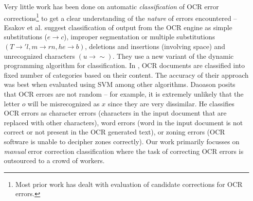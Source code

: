 \documentclass[10pt, conference, compsocconf]{IEEEtran}
\begin{document}
Very little work has been done on automatic \emph{classification} of OCR error corrections\footnote{Most prior work has dealt with evaluation of candidate corrections for OCR errors.} to get a clear understanding of the \emph{nature} of errors encountered -- Esakov et al. \cite{Esakov_94a} suggest classification of output from the OCR engine as simple substitutions ($e \rightarrow c$), improper segmentation or multiple substitutions $(T \rightarrow 'l, m \rightarrow rn, he \rightarrow b)$, deletions and insertions (involving space) and unrecognized characters $(u \rightarrow \sim)$. They use a new variant of the dynamic programming algorithm for classification. In \cite{hybred}, OCR documents are classified into fixed number of categories based on their content. The accuracy of their approach was best when evaluated using SVM among other algorithms. Daoason \cite{Jon_12} posits that OCR errors are not random -- for example, it is extremely unlikely that the letter $o$ will be misrecognized as $x$ since they are very dissimilar. He classifies OCR errors as character errors (characters in the input document that are replaced with other characters), word errors (word in the input document is not correct or not present in the OCR generated text), or zoning errors (OCR software is unable to decipher zones correctly). Our work primarily focusses on \emph{manual} error correction classification where the task of correcting OCR errors is outsourced to a crowd of workers. 

\end{document}
